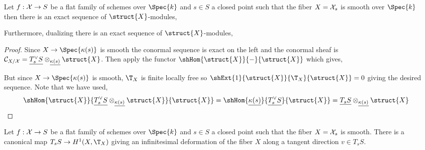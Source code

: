 \documentclass[12pt]{article}
\begin{document}
\begin{cor}
Let $f : \mathcal{X} \to S$ be a flat family of schemes over $\Spec{k}$ and $s \in S$ a closed point such that the fiber $X = \mathcal{X}_s$ is smooth over $\Spec{k}$ then there is an exact sequence of $\struct{X}$-modules,
\begin{center}
\end{center}
Furthermore, dualizing there is an exact sequence of $\struct{X}$-modules,
\begin{center}
\end{center}
\end{cor}

\begin{proof}
Since $X \to \Spec{\kappa(s)}$ is smooth the conormal sequence is exact on the left and the conormal sheaf is $\C_{X/\X} = \underline{T_s^\vee S} \otimes_{\underline{\kappa(s)}} \struct{X}$. Then apply the functor $\shHom{\struct{X}}{-}{\struct{X}}$ which gives,
\begin{center}
\end{center}
But since $X \to \Spec{\kappa(s)}$ is smooth, $\T_{X}$ is finite locally free so $\shExt{1}{\struct{X}}{\T_{X}}{\struct{X}} = 0$ giving the desired sequence. Note that we have used,
\[ \shHom{\struct{X}}{\underline{T_s^\vee S} \otimes_{\underline{\kappa(s)}} \struct{X}}{\struct{X}} = \shHom{\underline{\kappa(s)}}{\underline{T_s^\vee S}}{\struct{X}} = \underline{T_s S} \otimes_{\underline{\kappa(s)}} \struct{X} \]
\end{proof}

\begin{prop}
Let $f : \mathcal{X} \to S$ be a flat family of schemes over $\Spec{k}$ and $s \in S$ a closed point such that the fiber $X = \mathcal{X}_s$ is smooth. There is a canonical map $T_s S \to H^1(X, \T_{X})$ giving an infinitesimal deformation of the fiber $X$ along a tangent direction $v \in T_s S$.
\end{prop}
\end{document}

